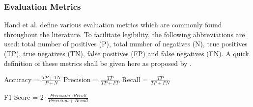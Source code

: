 \subsubsection{Evaluation Metrics}
Hand et al. define various evaluation metrics \citep{hand2021f} which are commonly found throughout the literature. To facilitate legibility, the following abbreviations are used: total number of positives (P), total number of negatives (N), true positives (TP), true negatives (TN), false positives (FP) and false negatives (FN). A quick definition of these metrics shall be given here as proposed by \cite{hand2021f}. \newline
\begin{center}
	Accuracy = $\frac{TP + TN}{P + N}$ \hspace{4em} Precision = $\frac{TP}{TP + FP}$ \hspace{4em} Recall = $\frac{TP}{TP + FN}$ \newline
\end{center}
\begin{center}
	F1-Score = $2 \cdot \frac{Precision \cdot Recall}{Precision + Recall}$
\end{center}